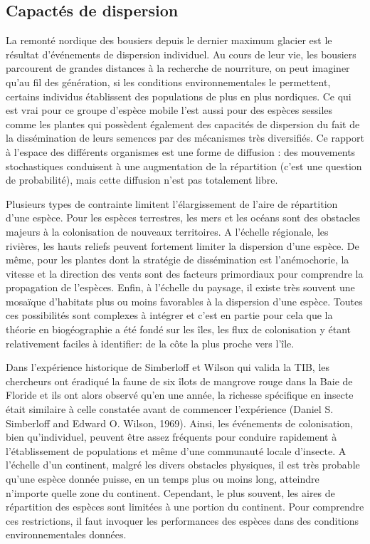 \subsection*{Capactés de dispersion}\label{capactuxe9s-de-dispersion}

La remonté nordique des bousiers depuis le dernier maximum glacier est
le résultat d'événements de dispersion individuel. Au cours de leur vie,
les bousiers parcourent de grandes distances à la recherche de
nourriture, on peut imaginer qu'au fil des génération, si les conditions
environnementales le permettent, certains individus établissent des
populations de plus en plus nordiques. Ce qui est vrai pour ce groupe
d'espèce mobile l'est aussi pour des espèces sessiles comme les plantes
qui possèdent également des capacités de dispersion du fait de la
dissémination de leurs semences par des mécanismes très diversifiés. Ce
rapport à l'espace des différents organismes est une forme de diffusion
: des mouvements stochastiques conduisent à une augmentation de la
répartition (c'est une question de probabilité), mais cette diffusion
n'est pas totalement libre.

Plusieurs types de contrainte limitent l'élargissement de l'aire de
répartition d'une espèce. Pour les espèces terrestres, les mers et les
océans sont des obstacles majeurs à la colonisation de nouveaux
territoires. A l'échelle régionale, les rivières, les hauts reliefs
peuvent fortement limiter la dispersion d'une espèce. De même, pour les
plantes dont la stratégie de dissémination est l'anémochorie, la vitesse
et la direction des vents sont des facteurs primordiaux pour comprendre
la propagation de l'espèces. Enfin, à l'échelle du paysage, il existe
très souvent une mosaïque d'habitats plus ou moins favorables à la
dispersion d'une espèce. Toutes ces possibilités sont complexes à
intégrer et c'est en partie pour cela que la théorie en biogéographie a
été fondé sur les îles, les flux de colonisation y étant relativement
faciles à identifier: de la côte la plus proche vers l'île.

Dans l'expérience historique de Simberloff et Wilson qui valida la TIB,
les chercheurs ont éradiqué la faune de six îlots de mangrove rouge dans
la Baie de Floride et ils ont alors observé qu'en une année, la richesse
spécifique en insecte était similaire à celle constatée avant de
commencer l'expérience (Daniel S. Simberloff and Edward O. Wilson,
1969). Ainsi, les événements de colonisation, bien qu'individuel,
peuvent être assez fréquents pour conduire rapidement à l'établissement
de populations et même d'une communauté locale d'insecte. A l'échelle
d'un continent, malgré les divers obstacles physiques, il est très
probable qu'une espèce donnée puisse, en un temps plus ou moins long,
atteindre n'importe quelle zone du continent. Cependant, le plus
souvent, les aires de répartition des espèces sont limitées à une
portion du continent. Pour comprendre ces restrictions, il faut invoquer
les performances des espèces dans des conditions environnementales
données.

